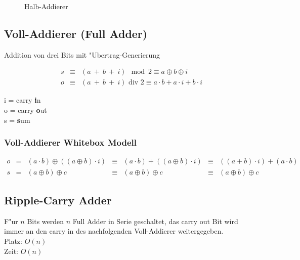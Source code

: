 \documentclass[german, 10pt, a4paper, twocolumn]{scrartcl}
\theoremstyle{definition}
\begin{document}
\begin{figure}[hbt]
 
 \centerline{\box\graph}
 \caption{Halb-Addierer}
 \label{halfadder}
\end{figure}

\subsection{Voll-Addierer (Full Adder)}

Addition von drei Bits mit "Ubertrag-Generierung

\begin{eqnarray*}
	s &	\equiv &	(a\ \boxed{+} \ b \ \boxed{+} \ i) \mod 2 \equiv a \oplus b \oplus i \\
	o &	\equiv &	(a\ \boxed{+} \ b \ \boxed{+} \ i) \mbox{ div } 2 \equiv a \cdotp b + a\cdotp i + b\cdotp i
\end{eqnarray*}

i = carry \textbf{i}n\\
o = carry \textbf{o}ut\\
s = \textbf{s}um

\subsubsection{Voll-Addierer Whitebox Modell}

\tiny
\begin{displaymath}
\begin{array}{ccccccc}
	o &	= &	(a\cdotp b) \oplus ((a\oplus b)\cdotp i) &	\equiv &	(a\cdotp b) + ((a\oplus b)\cdotp i) &	\equiv &	((a+b)\cdotp i)+(a\cdotp b)\\
	s &	= &	(a\oplus b)\oplus c &				\equiv &	(a\oplus b) \oplus c &			\equiv &	(a\oplus b)\oplus c
\end{array}
\end{displaymath}
\normalsize

\subsection{Ripple-Carry Adder}


F"ur $n$ Bits werden $n$ Full Adder in Serie geschaltet, das carry out Bit wird immer an den carry in des nachfolgenden Voll-Addierer weitergegeben.\\

Platz: $O(n)$\\
Zeit: $O(n)$
\end{document}
